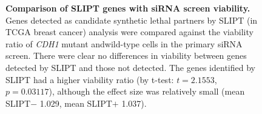 \begin{figure}[!htbp]
\begin{center}
   \end{center}
   \caption[Comparison of SLIPT genes with siRNA screen viability]{\small \textbf{Comparison of \gls{SLIPT} genes with \gls{siRNA} screen viability.} Genes detected as candidate \gls{synthetic lethal} partners by \gls{SLIPT} (in \gls{TCGA} breast cancer)  analysis were compared against the viability ratio of \textit{CDH1} \gls{mutant} and\gls{wild-type} cells in the primary \gls{siRNA} screen. There were clear no differences in viability between genes detected by \gls{SLIPT} and those not detected. The genes identified by \gls{SLIPT} had a higher viability ratio (by t-test: $t=2.1553$, $p=0.03117$), although the effect size was relatively small (mean SLIPT$-$ 1.029, mean SLIPT$+$ 1.037).  %
}
\label{fig:compare_viability_SL}
\end{figure}

